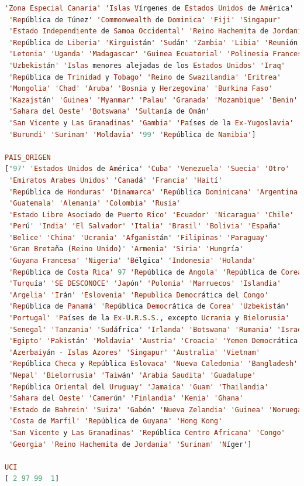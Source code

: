 \begin{lstlisting}[language=haskell, caption=Valores por columna, captionpos=b, label=lst:fiboHaskell]
 'Zona Especial Canaria' 'Islas Vírgenes de Estados Unidos de América'
 'República de Túnez' 'Commonwealth de Dominica' 'Fiji' 'Singapur'
 'Estado Independiente de Samoa Occidental' 'Reino Hachemita de Jordania'
 'República de Liberia' 'Kirguistán' 'Sudán' 'Zambia' 'Libia' 'Reunión'
 'Letonia' 'Uganda' 'Madagascar' 'Guinea Ecuatorial' 'Polinesia Francesa'
 'Uzbekistán' 'Islas menores alejadas de los Estados Unidos' 'Iraq'
 'República de Trinidad y Tobago' 'Reino de Swazilandia' 'Eritrea'
 'Mongolia' 'Chad' 'Aruba' 'Bosnia y Herzegovina' 'Burkina Faso'
 'Kazajstán' 'Guinea' 'Myanmar' 'Palau' 'Granada' 'Mozambique' 'Benin'
 'Sahara del Oeste' 'Botswana' 'Sultanía de Omán'
 'San Vicente y Las Granadinas' 'Gambia' 'Países de la Ex-Yugoslavia'
 'Burundi' 'Surinam' 'Moldavia' '99' 'República de Namibia']

PAIS_ORIGEN
['97' 'Estados Unidos de América' 'Cuba' 'Venezuela' 'Suecia' 'Otro'
 'Emiratos Arabes Unidos' 'Canadá' 'Francia' 'Haití'
 'República de Honduras' 'Dinamarca' 'República Dominicana' 'Argentina'
 'Guatemala' 'Alemania' 'Colombia' 'Rusia'
 'Estado Libre Asociado de Puerto Rico' 'Ecuador' 'Nicaragua' 'Chile'
 'Perú' 'India' 'El Salvador' 'Italia' 'Brasil' 'Bolivia' 'España'
 'Belice' 'China' 'Ucrania' 'Afganistán' 'Filipinas' 'Paraguay'
 'Gran Bretaña (Reino Unido)' 'Armenia' 'Siria' 'Hungría'
 'Guyana Francesa' 'Nigeria' 'Bélgica' 'Indonesia' 'Holanda'
 'República de Costa Rica' 97 'República de Angola' 'República de Corea'
 'Turquía' 'SE DESCONOCE' 'Japón' 'Polonia' 'Marruecos' 'Islandia'
 'Argelia' 'Irán' 'Eslovenia' 'Republica Democrática del Congo'
 'República de Panamá' 'República Democrática de Corea' 'Uzbekistán'
 'Portugal' 'Países de la Ex-U.R.S.S., excepto Ucrania y Bielorusia'
 'Senegal' 'Tanzania' 'Sudáfrica' 'Irlanda' 'Botswana' 'Rumania' 'Israel'
 'Egipto' 'Pakistán' 'Moldavia' 'Austria' 'Croacia' 'Yemen Democrática'
 'Azerbaiyán - Islas Azores' 'Singapur' 'Australia' 'Vietnam'
 'República Checa y República Eslovaca' 'Nueva Caledonia' 'Bangladesh'
 'Nepal' 'Bielorrusia' 'Taiwán' 'Arabia Saudita' 'Guadalupe'
 'República Oriental del Uruguay' 'Jamaica' 'Guam' 'Thailandia'
 'Sahara del Oeste' 'Camerún' 'Finlandia' 'Kenia' 'Ghana'
 'Estado de Bahrein' 'Suiza' 'Gabón' 'Nueva Zelandia' 'Guinea' 'Noruega'
 'Costa de Marfil' 'República de Guyana' 'Hong Kong'
 'San Vicente y Las Granadinas' 'República Centro Africana' 'Congo'
 'Georgia' 'Reino Hachemita de Jordania' 'Surinam' 'Níger']

UCI
[ 2 97 99  1]


\end{lstlisting}

